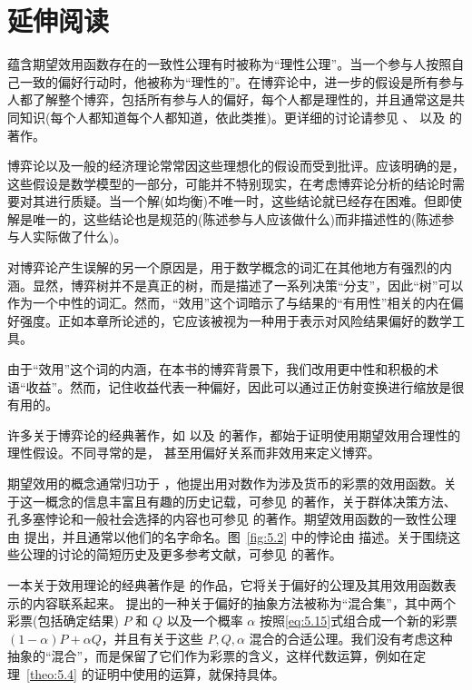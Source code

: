 \section{延伸阅读}\label{sec:5.10}

蕴含期望效用函数存在的一致性公理有时被称为“理性公理”。当一个参与人按照自己一致的偏好行动时，他被称为“理性的”。在博弈论中，进一步的假设是所有参与人都了解整个博弈，包括所有参与人的偏好，每个人都是理性的，并且通常这是共同知识(每个人都知道每个人都知道，依此类推)。更详细的讨论请参见 \citet{aumann1995}、\citet{aumann2008} 以及 \citet{perea2012} 的著作。

博弈论以及一般的经济理论常常因这些理想化的假设而受到批评。应该明确的是，这些假设是数学模型的一部分，可能并不特别现实，在考虑博弈论分析的结论时需要对其进行质疑。当一个解(如均衡)不唯一时，这些结论就已经存在困难。但即使解是唯一的，这些结论也是规范的(陈述参与人应该做什么)而非描述性的(陈述参与人实际做了什么)。

对博弈论产生误解的另一个原因是，用于数学概念的词汇在其他地方有强烈的内涵。显然，博弈树并不是真正的树，而是描述了一系列决策“分支”，因此“树”可以作为一个中性的词汇。然而，“效用”这个词暗示了与结果的“有用性”相关的内在偏好强度。正如本章所论述的，它应该被视为一种用于表示对风险结果偏好的数学工具。

由于“效用”这个词的内涵，在本书的博弈背景下，我们改用更中性和积极的术语“收益”。然而，记住收益代表一种偏好，因此可以通过正仿射变换进行缩放是很有用的。

许多关于博弈论的经典著作，如 \citet{luce1957} 以及 \citet{myerson1991} 的著作，都始于证明使用期望效用合理性的理性假设。不同寻常的是，\citet{osborne1994} 甚至用偏好关系而非效用来定义博弈。

期望效用的概念通常归功于 \citet{bernoulli1738}，他提出用对数作为涉及货币的彩票的效用函数。关于这一概念的信息丰富且有趣的历史记载，可参见 \citet{szpiro2020} 的著作，关于群体决策方法、孔多塞悖论和一般社会选择的内容也可参见 \citet{szpiro2010} 的著作。期望效用函数的一致性公理由 \citet{vonneumann1947} 提出，并且通常以他们的名字命名。图~\ref{fig:5.2} 中的悖论由 \citet{allais1953} 描述。关于围绕这些公理的讨论的简短历史及更多参考文献，可参见 \citet{moscati2016} 的著作。

一本关于效用理论的经典著作是 \citet{fishburn1970} 的作品，它将关于偏好的公理及其用效用函数表示的内容联系起来。\citet{herstein1953} 提出的一种关于偏好的抽象方法被称为“混合集”，其中两个彩票(包括确定结果) \(P\) 和 \(Q\) 以及一个概率 \(\alpha\) 按照\eqref{eq:5.15}式组合成一个新的彩票 \(\left( {1 - \alpha }\right) P + {\alpha Q}\)，并且有关于这些 \(P,Q,\alpha\) 混合的合适公理。我们没有考虑这种抽象的“混合”，而是保留了它们作为彩票的含义，这样代数运算，例如在定理~\ref{theo:5.4} 的证明中使用的运算，就保持具体。

